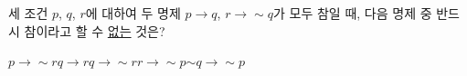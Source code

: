 세 조건 $p$, $q$, $r$에 대하여 두 명제 $p\longrightarrow q$, $r\longrightarrow {\sim}q$가 모두 참일 때, 다음 명제 중 반드시 참이라고 할 수 \underline{없는} 것은?
\begin{choices32}{$p\longrightarrow {\sim}r$}{$q\longrightarrow r$}{$q\longrightarrow {\sim}r$}{$r\longrightarrow {\sim}p$}{${\sim}q\longrightarrow {\sim}p$}\end{choices32}
